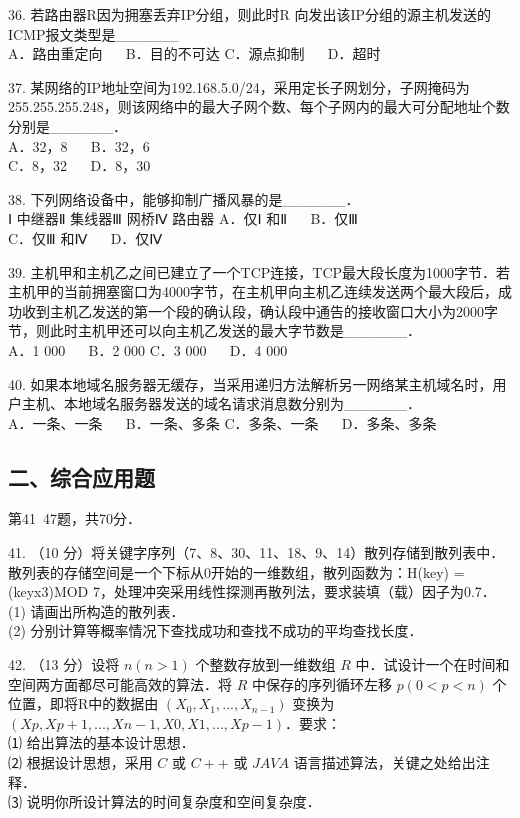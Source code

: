 36. 若路由器R因为拥塞丢弃IP分组，则此时R 向发出该IP分组的源主机发送的ICMP报文类型是______ \\
A．路由重定向 $\quad$ B．目的不可达
C．源点抑制 $\quad$ D．超时

37. 某网络的IP地址空间为192.168.5.0/24，采用定长子网划分，子网掩码为255.255.255.248，则该网络中的最大子网个数、每个子网内的最大可分配地址个数分别是______．  \\
A．32，8 $\quad$ B．32，6 \\
C．8，32 $\quad$ D．8，30

38. 下列网络设备中，能够抑制广播风暴的是______． \\
Ⅰ 中继器Ⅱ 集线器Ⅲ 网桥Ⅳ 路由器
A．仅Ⅰ 和Ⅱ $\quad$ B．仅Ⅲ \\
C．仅Ⅲ 和Ⅳ $\quad$ D．仅Ⅳ

39. 主机甲和主机乙之间已建立了一个TCP连接，TCP最大段长度为1000字节．若主机甲的当前拥塞窗口为4000字节，在主机甲向主机乙连续发送两个最大段后，成功收到主机乙发送的第一个段的确认段，确认段中通告的接收窗口大小为2000字节，则此时主机甲还可以向主机乙发送的最大字节数是______． \\
A．1 000 $\quad$ B．2 000
C．3 000 $\quad$ D．4 000

40. 如果本地域名服务器无缓存，当采用递归方法解析另一网络某主机域名时，用户主机、本地域名服务器发送的域名请求消息数分别为______． \\
A．一条、一条 $\quad$ B．一条、多条
C．多条、一条 $\quad$ D．多条、多条

\subsection{二、综合应用题}
第41~47题，共70分．

41. （10 分）将关键字序列（7、8、30、11、18、9、14）散列存储到散列表中．散列表的存储空间是一个下标从0开始的一维数组，散列函数为：H(key) = (keyx3)MOD 7，处理冲突采用线性探测再散列法，要求装填（载）因子为0.7． \\
(1) 请画出所构造的散列表．  \\
(2) 分别计算等概率情况下查找成功和查找不成功的平均查找长度．

42. （13 分）设将 $n(n>1)$ 个整数存放到一维数组 $R$ 中．试设计一个在时间和空间两方面都尽可能高效的算法．将 $R$ 中保存的序列循环左移 $p(0<p<n)$ 个位置，即将R中的数据由 $(X_0, X_1, ..., X_{n-1})$ 变换为 $(Xp,Xp+1, ..., Xn-1, X0, X1, ..., Xp-1)$．要求：  \\
⑴ 给出算法的基本设计思想．  \\
⑵ 根据设计思想，采用 $C$ 或 $C++$ 或 $JAVA$ 语言描述算法，关键之处给出注释．  \\
⑶ 说明你所设计算法的时间复杂度和空间复杂度．

